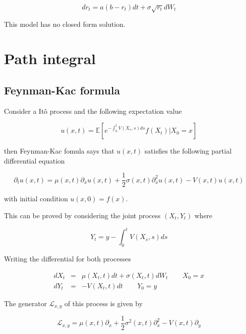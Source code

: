 \documentclass[11pt,a4paper]{article}
\begin{document}
\begin{equation*}
    dr_t = a(b-r_t)dt + \sigma \sqrt{r_t}dW_t
\end{equation*}

This model has no closed form solution.

\section{Path integral}

\subsection{Feynman-Kac formula}

Consider a It\^{o} process and the following expectation value

\begin{equation}
    u(x,t) = \mathbb{E}[e^{-\int_0^t V(X_s,s)ds}f(X_t)|X_0=x]
\end{equation}

then Feynman-Kac fomula says that $u(x,t)$ satisfies the following partial differential equation

\begin{equation}
    \partial_tu(x,t) = \mu(x,t)\partial_xu(x,t) +\frac{1}{2}\sigma(x,t)\partial^2_xu(x,t)-V(x,t)u(x,t)
\end{equation}

with initial condition $u(x,0) = f(x)$.

This can be proved by considering the joint process $(X_t,Y_t)$ where 

\begin{equation}
    Y_t = y-\int_0^t V(X_s,s)ds
\end{equation}

Writing the differential for both processes

\begin{eqnarray*}
    dX_t &=& \mu(X_t,t) dt + \sigma(X_t,t) dW_t \hspace{25pt} X_0 = x \\
    dY_t &=& -V(X_t,t)dt  \hspace{25pt} Y_0=y
\end{eqnarray*}

The generator $\mathcal{L}_{x,y}$ of this process is given by

\begin{equation}
    \mathcal{L}_{x,y} = \mu(x,t)\partial_x + \frac{1}{2}\sigma^{2}(x,t)\partial^2_x-V(x,t)\partial_y
\end{equation}
\end{document}
